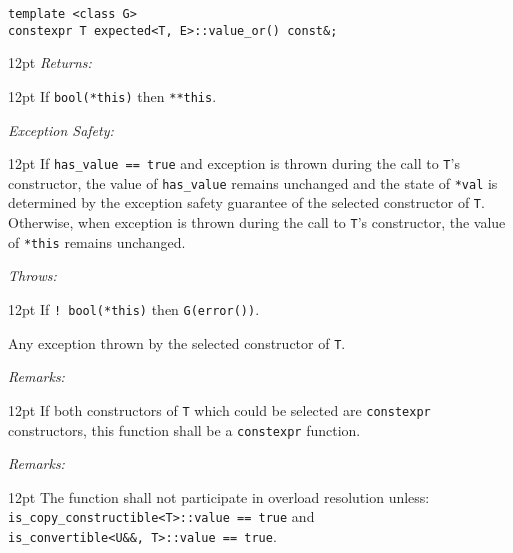 \documentclass[a4paper,10pt]{article}
\newcommand{\cpp}[1]{\lstinline{#1}}
\newcommand{\wordingItem}[1]{\noindent\textit{#1:}}
\newenvironment{wordingTextItem}[1]{\wordingItem{#1}\vspace{7pt}\noindent\begin{adjustwidth}{12pt}{}}{\vspace{7pt}\end{adjustwidth}}
\newenvironment{wordingPara}{\begin{adjustwidth}{12pt}{}}{\end{adjustwidth}}
\begin{document}
\begin{lstlisting}[xleftmargin=0pt]
template <class G>
constexpr T expected<T, E>::value_or() const&; 
\end{lstlisting}
\begin{wordingPara}
\begin{wordingTextItem}{Returns}
If \cpp{bool(*this)} then \cpp{**this}.
\end{wordingTextItem}
\begin{wordingTextItem}{Exception Safety}
If \cpp{has_value == true} and exception is thrown during the call to \cpp{T}'s constructor, the value of \cpp{has_value} remains unchanged and the state of \cpp{*val} is determined by the exception safety guarantee of the selected constructor of \cpp{T}. Otherwise, when exception is thrown during the call to \cpp{T}'s constructor, the value of \cpp{*this} remains unchanged.
\end{wordingTextItem}
\begin{wordingTextItem}{Throws}
If \cpp{! bool(*this)} then \cpp{G(error())}.

\noindent
Any exception thrown by the selected constructor of \cpp{T}.
\end{wordingTextItem}
\begin{wordingTextItem}{Remarks}
If both constructors of \cpp{T} which could be selected are \cpp{constexpr} constructors, this function shall be a \cpp{constexpr} function.
\end{wordingTextItem}
\begin{wordingTextItem}{Remarks}
The function shall not participate in overload resolution unless: \\
\cpp{is_copy_constructible<T>::value == true} and \\
\cpp{is_convertible<U&&, T>::value == true}.
\end{wordingTextItem}
\end{wordingPara}
\end{document}
